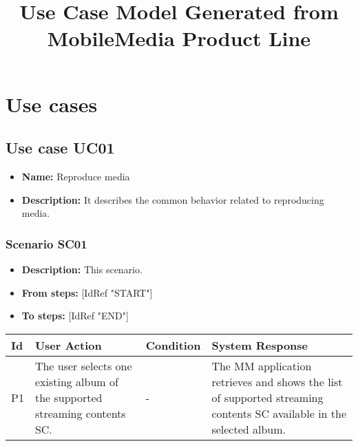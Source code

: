 \documentclass[a4paper,11pt]{article}
\title{Use Case Model Generated from MobileMedia Product Line}
\newcommand{\bl}{\\ \hline}
\begin{document}
\maketitle
\section{Use cases}
\subsection{Use case UC01}
\begin{itemize}
\item {\bf Name: }Reproduce media
\item {\bf Description: }It describes the common behavior related to reproducing media.
\end{itemize}
\subsubsection{Scenario SC01}
\begin{itemize}
\item {\bf Description:} This scenario.
\item {\bf From steps:} [IdRef "START"]
\item {\bf To steps:} [IdRef "END"]
\end{itemize}
\begin{tabular}{|p{0.4in}|p{1.5in}|p{1.5in}|p{1.5in}|}
\hline
Id & User Action & Condition & System Response \bl 
P1 & 
                	The user selects one existing album of the supported streaming
					contents {SC}.
				 & - & 
                	The MM application retrieves and
					shows the list of supported streaming contents {SC}
					available in the selected album.
				\bl
\end{tabular}
\end{document}
